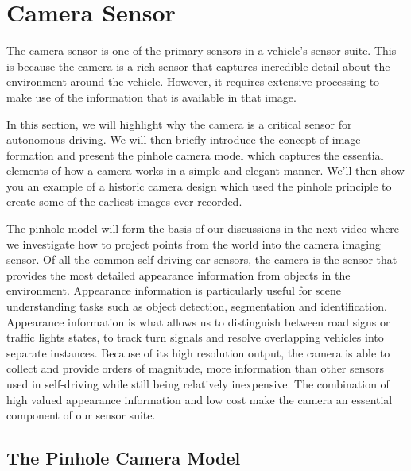 \section{Camera Sensor}
\label{camera_sensor}

The camera sensor is one of the primary sensors in a vehicle's sensor suite.
This is because the camera is a rich sensor that captures incredible detail
about the environment around the vehicle. However, it requires
extensive processing to make use of the information that is
available in that image. 

In this section, we will highlight why the camera is a critical sensor
for autonomous driving. We will then briefly introduce the concept of
image formation and present the pinhole camera model
which captures the essential elements
of how a camera works in a simple
and elegant manner. We'll then show you an example of
a historic camera design which used the pinhole
principle to create some of the earliest
images ever recorded. 



The pinhole model will
form the basis of our discussions in
the next video where we investigate how to
project points from the world into the camera
imaging sensor. Of all the common
self-driving car sensors, the camera is the sensor
that provides the most detailed
appearance information from objects in the environment. Appearance information
is particularly useful for scene understanding tasks such as object detection, segmentation and identification. Appearance information is
what allows us to distinguish between road signs or
traffic lights states, to track turn signals and resolve overlapping vehicles
into separate instances. Because of its high
resolution output, the camera is able to collect and provide orders of magnitude, more information than
other sensors used in self-driving while still
being relatively inexpensive. The combination of high valued
appearance information and low cost make
the camera an essential component of our sensor suite. 


\subsection{The Pinhole Camera Model}

